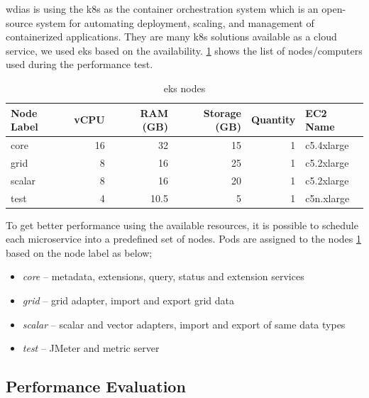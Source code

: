 \documentclass[conference]{IEEEtran}
\begin{document}
\acrshort{wdias} is using the \acrfull{k8s} as the container orchestration system which is an open-source system for automating deployment, scaling, and management of containerized applications. They are many \acrshort{k8s} solutions available as a cloud service, we used \acrfull{eks} based on the availability. \cref{ptab:aws_eks_nodes} shows the list of nodes/computers used during the performance test.

\begin{table}[tb!]
\caption{\acrshort{eks} nodes}
\begin{center}
\begin{adjustbox}{width=0.45\textwidth}
\begin{tabular}{|l|r|r|r|r|l|}
\hline
\textbf{Node Label} & \textbf{vCPU} & \textbf{RAM (GB)} & \textbf{Storage (GB)} & \textbf{Quantity} & \textbf{EC2 Name} \\ \hline
core & 16 & 32 & 15 & 1 & c5.4xlarge \\ \hline
grid & 8 & 16 & 25 & 1 & c5.2xlarge \\ \hline
scalar & 8 & 16 & 20 & 1 & c5.2xlarge \\ \hline
test & 4 & 10.5 & 5 & 1 & c5n.xlarge \\ \hline
\end{tabular}
\end{adjustbox}
\label{ptab:aws_eks_nodes}
\end{center}
\end{table}


To get better performance using the available resources, it is possible to schedule each microservice into a predefined set of nodes. Pods are assigned to the nodes \cref{ptab:aws_eks_nodes} based on the node label as below;
\begin{itemize}
    \item \emph{core} -- metadata, extensions, query, status and extension services
    \item \emph{grid} -- grid adapter, import and export grid data
    \item \emph{scalar} -- scalar and vector adapters, import and export of same data types
    \item \emph{test} --  JMeter and metric server
\end{itemize}

\subsection{Performance Evaluation}
\label{psubse:performance_evaluation}
\end{document}
